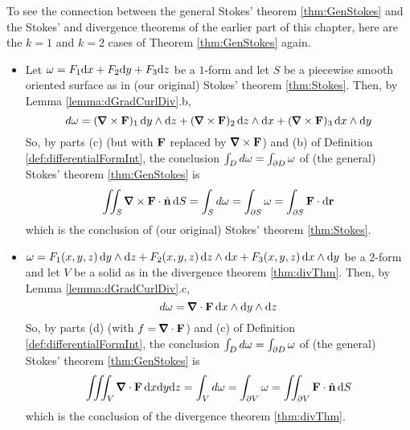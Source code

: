 To see the connection between the general Stokes' theorem \ref{thm:GenStokes}
and the Stokes' and divergence theorems of the earlier part of this chapter, 
here are the $k=1$ and $k=2$ cases of Theorem \ref{thm:GenStokes} again.
\begin{itemize}
\item 
  Let $\omega = F_1 \mathrm{d}x + F_2 \mathrm{d}y + F_3 \mathrm{d}z$ be a $1$-form
and let $S$ be a piecewise smooth oriented surface as in (our original)
Stokes' theorem \ref{thm:Stokes}. Then, by Lemma \ref{lemma:dGradCurlDiv}.b,
\begin{equation*}
d\om = (\vnabla\times\vF)_1\,\dee{y}\wedge\dee{z}
   +(\vnabla\times\vF)_2\,\dee{z}\wedge\dee{x}
   +(\vnabla\times\vF)_3\,\dee{x}\wedge\dee{y}
\end{equation*}
So, by parts (c) (but with $\mathbf{F}$ replaced by $\vnabla\times\vF$) and (b)
of Definition \ref{def:differentialFormInt},
the conclusion $\int_D d\omega=\int_{\partial D}\omega$ of 
(the general) Stokes' theorem \ref{thm:GenStokes} is
\begin{align*}
\dblInt_S \vnabla\times\vF\cdot\hn\,\dee{S}
=\int_S d\om=\int_{\partial S}\om
=\int_{\partial S}\vF\cdot\dee{\vr}
\end{align*}
which is the conclusion of (our original) Stokes' theorem \ref{thm:Stokes}.

\item 
  $\omega = F_1(x,y,z)\,\mathrm{d}y\wedge\mathrm{d}z
 + F_2(x,y,z)\,\mathrm{d}z\wedge\mathrm{d}x
 + F_3(x,y,z)\,\mathrm{d}x\wedge\mathrm{d}y$   
be a  $2$-form
and let $V$ be a solid as in the divergence theorem \ref{thm:divThm}. 
Then, by Lemma \ref{lemma:dGradCurlDiv}.c,
\begin{equation*}
d\om = \vnabla\cdot\vF\,\dee{x}\wedge\dee{y}\wedge\dee{z}
\end{equation*}
So, by parts (d) (with $f =\vnabla\cdot\vF$) and (c)
of Definition \ref{def:differentialFormInt},
the conclusion $\int_D d\omega=\int_{\partial D}\omega$ of 
(the general) Stokes' theorem \ref{thm:GenStokes} is
\begin{align*}
\tripInt_V \vnabla\cdot\vF\,\dee{x}\dee{y}\dee{z} 
=\int_V d\om=\int_{\partial V}\om
=\dblInt_{\partial V}\vF\cdot\hn\,\dee{S}
\end{align*}
which is the conclusion of the divergence theorem \ref{thm:divThm}.




\end{itemize}











